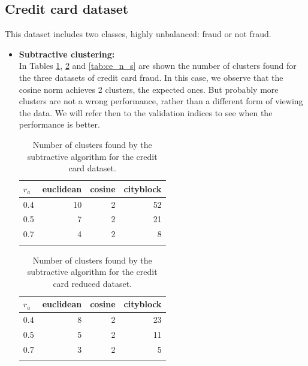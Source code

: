 \documentclass[conference]{IEEEtran}
\begin{document}
\subsection{Credit card dataset}
This dataset includes two classes, highly unbalanced: fraud or not fraud.
\begin{itemize}
    \item \textbf{Subtractive clustering:}\\
    In Tables \ref{tab:c1_n_s}, \ref{tab:c2_n_s} and \ref{tab:ce_n_s} are shown the number of clusters found for the three datasets of credit card fraud. In this case, we observe that the cosine norm achieves 2 clusters, the expected ones. But probably more clusters are not a wrong performance, rather than a different form of viewing the data. We will refer then to the validation indices to see when the performance is better.
    \begin{table}[ht!]
        \centering
        \begin{tabular}{lrrr}
        \toprule
        $r_a$ &  euclidean &  cosine &  cityblock \\
        \midrule
        0.4 &         10 &       2 &         52 \\
        0.5 &          7 &       2 &         21 \\
        0.7 &          4 &       2 &          8 \\
        \bottomrule \\
        \end{tabular}
        \caption{Number of clusters found by the subtractive algorithm for the credit card dataset.}
        \label{tab:c1_n_s}
    \end{table}
    
    \begin{table}[ht!]
        \centering
        \begin{tabular}{lrrr}
        \toprule
        $r_a$ &  euclidean &  cosine &  cityblock \\
        \midrule
        0.4 &          8 &       2 &         23 \\
        0.5 &          5 &       2 &         11 \\
        0.7 &          3 &       2 &          5 \\
        \bottomrule \\
        \end{tabular}
        \caption{Number of clusters found by the subtractive algorithm for the credit card reduced dataset.}
        \label{tab:c2_n_s}
    \end{table}
    

\end{itemize}
\end{document}
